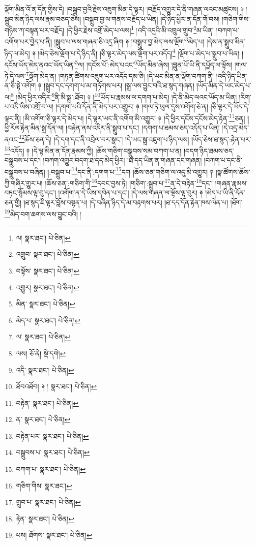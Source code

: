 ལྡོག་མིན་འོ་ན་དོན་གྱིས་དེ། །བསྒྲུབ་བྱའི་རྗེས་འཇུག་མིན་དེ་ལྟར། །བརྗོད་འགྱུར་དེ་ནི་གཞན་ལའང་མཚུངས། ༈ །སྒྲུབ་མིན་ཉིད་ལས་རྣམ་བཅད་ཅེས། །བསྒྲུབ་བྱ་ལ་གནས་བརྗོད་པ་ཡིན། །དེ་ཉིད་ཕྱིར་ན་དོན་གོ་བས། །གཅིག་གིས་གཉིས་ཀ་བསྟན་པར་བརྗོད། །དེ་ཕྱིར་རྗེས་འགྲོ་མེད་པ་ལས།\footnote{ལ།  སྣར་ཐང་།  པེ་ཅིན། } །འདི་འདྲའི་མི་འཁྲུལ་གྲུབ་\footnote{འགྲུབ་  སྣར་ཐང་།  པེ་ཅིན། }མ་ཡིན། །བཀག་པ་འགོག་པར་བྱེད་པ་ནི། །སྒྲུབ་པ་ལས་གཞན་ཅི་འདྲ་ཞིག ༈ །བསྒྲུབ་བྱ་མེད་ལས་ལྡོག་\footnote{བལྟོས་  སྣར་ཐང་།  པེ་ཅིན། }མེད་པ། །དེས་ན་སྒྲུབ་མིན་ཉིད་ལ་མེད། ༈ །མེད་ཅེས་ལྡོག་པ་དེ་ཉིད་ནི། །ཅི་ལྟར་མེད་ལས་ལྡོག་པར་འདོད།\footnote{འགྱུར།  སྣར་ཐང་།  པེ་ཅིན། } །ལྡོག་པ་མེད་པ་སྒྲུབ་པ་ཡིན། །དངོས་ཡོད་མེད་ནའང་ཡོད་ཡིན་\footnote{མིན་  སྣར་ཐང་།  པེ་ཅིན། }ལ། །དངོས་པོ་:མེད་པའང་\footnote{མེད་པ་  སྣར་ཐང་།  པེ་ཅིན། }ཡོད་མིན་ཞེས། །བླུན་པོ་ཡི་ནི་དཔྱོད་ལ་ལྟོས། །གལ་ཏེ་དེ་ལས་\footnote{ལ་  སྣར་ཐང་།  པེ་ཅིན། }ལྡོག་མེད་ན། །གཏན་ཚིགས་འཇུག་པར་འདོད་དམ་ཅི། །དེ་ཡང་མིན་ན་ལྡོག་བཀག་ནི། །འདི་ཉིད་ཡིན་ན་ཅི་སྟེ་འགོག ༈ །སྒྲུབ་དང་དགག་པ་མ་གཏོགས་པར། །སྒྲ་ལས་བྱུང་བའི་ཐ་སྙད་གཞན། །ཡོད་མིན་དེ་ཡང་མེད་པ་ལ།\footnote{ལས།  ཅོ་ནེ།  སྡེ་དགེ། } །མེད་ཕྱིར་འདིར་\footnote{འདི་  སྣར་ཐང་།  པེ་ཅིན། }ནི་མི་སྨྲ་:ཐོབ། ༈ །\footnote{ཐོབའཐོབ། ༈ །  སྣར་ཐང་།  པེ་ཅིན། }ཡོད་པ་རྣམས་ལ་དགག་པ་མེད། །དེ་ནི་མེད་ལའང་ཡོད་མ་ཡིན། །རིག་པ་འདི་ཡིས་འགྲོ་བ་ལ། །དགག་པའི་དོན་ནི་མེད་པར་འགྱུར། ༈ །གལ་ཏེ་ཡུལ་དུས་འགོག་ཅེ་ན། །ཅི་ལྟར་དེ་ཡོད་དེ་ལྟར་ནི། །མི་འགོག་ཅི་ལྟར་དེ་མེད་པ། །དེ་ལྟར་ཡང་ནི་འགོག་མི་འགྱུར། ༈ །དེ་ཕྱིར་དངོས་དངོས་མེད་རྟེན་\footnote{བརྟེན་  སྣར་ཐང་།  པེ་ཅིན། }ཅན། །ཕྱི་རོལ་རྟེན་མིན་སྒྲ་དོན་ལ། །བརྟེན་ནས་འདིར་ནི་སྒྲུབ་པ་དང་། །དགག་པ་ཐམས་ཅད་འདོད་པ་ཡིན། །དེ་འདྲ་མེད་ནའང་\footnote{ན་  སྣར་ཐང་།  པེ་ཅིན། }ཆོས་ཅན་དེ། །དེ་དག་དང་ནི་འབྲེལ་བར་སྣང་། །དེ་ཡང་སྒྲ་འཇུག་པ་ཉིད་ལས། །ཡོད་ཅེས་ཐ་སྙད་:རྟེན་པར་\footnote{བརྟེན་པར་  སྣར་ཐང་།  པེ་ཅིན། }འདོད། ༈ །དེ་ལྟ་མིན་ན་དོན་རྣམས་ཀྱི། །ཆོས་གཅིག་བསྒྲུབས་སམ་བཀག་པ་ན། །བདག་ཉིད་ཐམས་ཅད་བསྒྲུབས་པ་དང་། །བཀག་འགྱུར་བདག་ཐ་དད་མེད་ཕྱིར། །ཐ་དད་ཡིན་ན་གཞན་དང་གཞན། །བཀག་པ་དང་ནི་བསྒྲུབས་པ་བཞིན། །:བསྒྲུབ་པ་\footnote{བསྒྲུབས་པ་  སྣར་ཐང་།  པེ་ཅིན། }དང་ནི་:དགག་པ་\footnote{བཀག་པ་  སྣར་ཐང་།  པེ་ཅིན། }དག །ཆོས་ཅན་གཅིག་ལ་འདུ་མི་འགྱུར། ༈ །སྣ་ཚོགས་ཆོས་ཀྱི་གཞིར་གྱུར་པ། །ཆོས་ཅན་:གཅིག་གི་\footnote{གཅིག་གིས་  སྣར་ཐང་། }དབང་བྱས་ཏེ། །གཅིག་:སྒྲུབ་པ་\footnote{གྲུབ་པ་  སྣར་ཐང་།  པེ་ཅིན། }ན་དེ་བརྟེན་\footnote{རྟེན་  སྣར་ཐང་།  པེ་ཅིན། }དང་། །གཞན་རྣམས་བཏང་སྙོམས་ལྟ་བུ་དང་། །འགོག་ན་དེ་ཡིས་དབེན་པ་དང་། །དེ་ལས་གཞན་ལ་ལྟོས་ལྟ་བུར། ༈ །མེད་པ་ཡི་ནི་དོན་ཅན་གྱི། །ཐ་སྙད་ཇི་ལྟར་བློས་བསྟན་པ། །དེ་བཞིན་ཉིད་དེ་མ་བརྟགས་པར། །ཐ་དད་དོན་རྟེན་ཁས་ལེན་པ། །ཐོག་\footnote{པས། ཐོགས་  སྣར་ཐང་།  པེ་ཅིན། }མེད་བག་ཆགས་ལས་བྱུང་བའི། །
